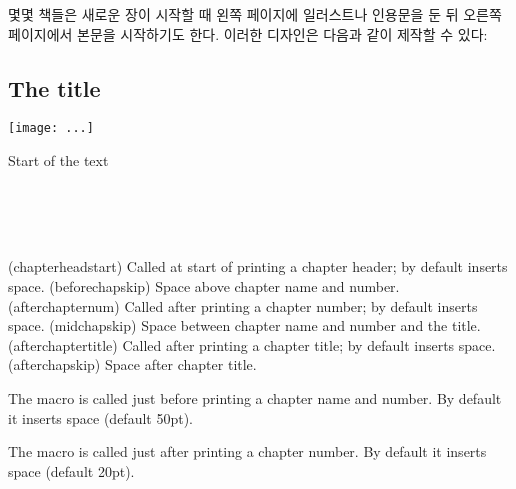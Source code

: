 몇몇 책들은 새로운 장이 시작할 때 왼쪽 페이지에 일러스트나
인용문을 둔 뒤 오른쪽 페이지에서 본문을 시작하기도 한다.
이러한 디자인은 다음과 같이 제작할 수 있다:
\begin{lcode}
\openleft                %
\chapter{The title}      %
\begin{centering}        %
\texttt{[image: ...]}
\end{centering}
\clearpage               %
Start of the text        %
\end{lcode}


\begin{syntax}
\cmd{\chapterheadstart} \lnc{\beforechapskip} \\ 
\cmd{\afterchapternum} \lnc{\midchapskip} \\
\cmd{\afterchaptertitle} \lnc{\afterchapskip} \\
\end{syntax}
\glossary(chapterheadstart)%
  {}%
  {Called at start of printing a chapter header; by default inserts  space.}
\glossary(beforechapskip)%
  {}%
  {Space above chapter name and number.}
\glossary(afterchapternum)%
  {}%
  {Called after printing a chapter number; by default inserts  space.}
\glossary(midchapskip)%
  {}%
  {Space between chapter name and number and the title.}
\glossary(afterchaptertitle)%
  {}%
  {Called after printing a chapter title; by default inserts  space.}
\glossary(afterchapskip)%
  {}%
  {Space after chapter title.}

The macro \cmd{\chapterheadstart} is called just before printing a chapter
name and number. By default it inserts \lnc{\beforechapskip} space (default
50pt).

The macro \cmd{\afterchapternum} is called just after printing a chapter
number. By default it inserts \lnc{\midchapskip} space (default
20pt).

